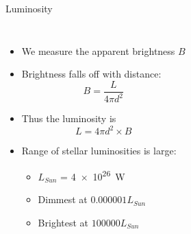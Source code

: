 \documentclass[pdf, aspectratio=169]{beamer}
\begin{document}
\begin{frame}{Luminosity}
  \begin{columns}
	\begin{itemize}
	  \item We measure the apparent brightness $B$
	  \item Brightness falls off with distance:
		\[B = \frac{L}{4\pi d^2}\]
	  \item Thus the luminosity is
		\[L = 4\pi d^2 \times B\]
	  \item Range of stellar luminosities is large:
		\begin{itemize}
		  \item $L_{Sun}$ = \SI{4e26}{\watt}
		  \item Dimmest at $0.000001 L_{Sun}$
		  \item Brightest at $100000 L_{Sun}$
		\end{itemize}
	\end{itemize}
	\begin{center}
	\end{center}
  \end{columns}
\end{frame}

\end{document}
